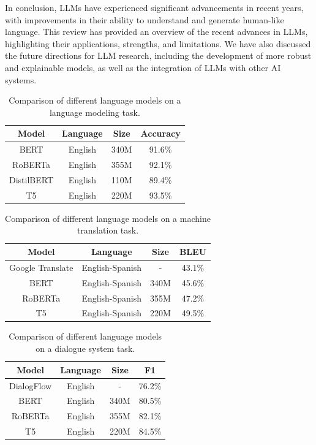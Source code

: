 \documentclass{article}
\begin{document}
In conclusion, LLMs have experienced significant advancements in recent years, with improvements in their ability to understand and generate human-like language. This review has provided an overview of the recent advances in LLMs, highlighting their applications, strengths, and limitations. We have also discussed the future directions for LLM research, including the development of more robust and explainable models, as well as the integration of LLMs with other AI systems.

\begin{table}[h]
\centering
\begin{tabular}{|c|c|c|c|}
\hline
\textbf{Model} & \textbf{Language} & \textbf{Size} & \textbf{Accuracy} \\ \hline
BERT & English & 340M & 91.6\% \\ \hline
RoBERTa & English & 355M & 92.1\% \\ \hline
DistilBERT & English & 110M & 89.4\% \\ \hline
T5 & English & 220M & 93.5\% \\ \hline
\end{tabular}
\caption{Comparison of different language models on a language modeling task.}
\end{table}

\begin{table}[h]
\centering
\begin{tabular}{|c|c|c|c|}
\hline
\textbf{Model} & \textbf{Language} & \textbf{Size} & \textbf{BLEU} \\ \hline
Google Translate & English-Spanish & - & 43.1\% \\ \hline
BERT & English-Spanish & 340M & 45.6\% \\ \hline
RoBERTa & English-Spanish & 355M & 47.2\% \\ \hline
T5 & English-Spanish & 220M & 49.5\% \\ \hline
\end{tabular}
\caption{Comparison of different language models on a machine translation task.}
\end{table}

\begin{table}[h]
\centering
\begin{tabular}{|c|c|c|c|}
\hline
\textbf{Model} & \textbf{Language} & \textbf{Size} & \textbf{F1} \\ \hline
DialogFlow & English & - & 76.2\% \\ \hline
BERT & English & 340M & 80.5\% \\ \hline
RoBERTa & English & 355M & 82.1\% \\ \hline
T5 & English & 220M & 84.5\% \\ \hline
\end{tabular}
\caption{Comparison of different language models on a dialogue system task.}
\end{table}
\end{document}
